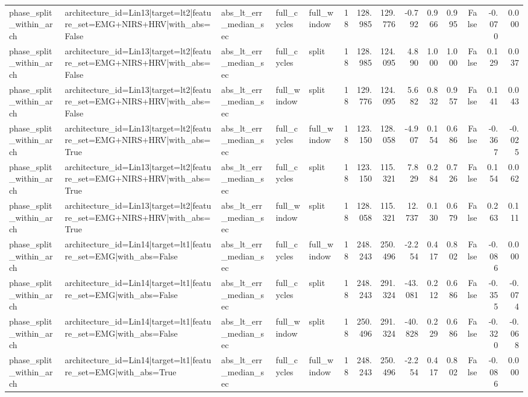 \begin{table}
\begin{tabular}{lllllrrrrrrrrr}
phase_split_within_arch & architecture_id=Lin13|target=lt2|feature_set=EMG+NIRS+HRV|with_abs=False & abs_lt_err_median_sec & full_cycles & full_window & 18 & 128.985 & 129.776 & -0.792 & 0.966 & 0.995 & False & -0.070 & 0.000 \\
phase_split_within_arch & architecture_id=Lin13|target=lt2|feature_set=EMG+NIRS+HRV|with_abs=False & abs_lt_err_median_sec & full_cycles & split & 18 & 128.985 & 124.095 & 4.890 & 1.000 & 1.000 & False & 0.129 & 0.037 \\
phase_split_within_arch & architecture_id=Lin13|target=lt2|feature_set=EMG+NIRS+HRV|with_abs=False & abs_lt_err_median_sec & full_window & split & 18 & 129.776 & 124.095 & 5.682 & 0.832 & 0.957 & False & 0.141 & 0.043 \\
phase_split_within_arch & architecture_id=Lin13|target=lt2|feature_set=EMG+NIRS+HRV|with_abs=True & abs_lt_err_median_sec & full_cycles & full_window & 18 & 123.150 & 128.058 & -4.907 & 0.154 & 0.686 & False & -0.367 & -0.025 \\
phase_split_within_arch & architecture_id=Lin13|target=lt2|feature_set=EMG+NIRS+HRV|with_abs=True & abs_lt_err_median_sec & full_cycles & split & 18 & 123.150 & 115.321 & 7.829 & 0.284 & 0.726 & False & 0.154 & 0.062 \\
phase_split_within_arch & architecture_id=Lin13|target=lt2|feature_set=EMG+NIRS+HRV|with_abs=True & abs_lt_err_median_sec & full_window & split & 18 & 128.058 & 115.321 & 12.737 & 0.130 & 0.679 & False & 0.263 & 0.111 \\
phase_split_within_arch & architecture_id=Lin14|target=lt1|feature_set=EMG|with_abs=False & abs_lt_err_median_sec & full_cycles & full_window & 18 & 248.243 & 250.496 & -2.254 & 0.417 & 0.802 & False & -0.086 & 0.000 \\
phase_split_within_arch & architecture_id=Lin14|target=lt1|feature_set=EMG|with_abs=False & abs_lt_err_median_sec & full_cycles & split & 18 & 248.243 & 291.324 & -43.081 & 0.212 & 0.686 & False & -0.355 & -0.074 \\
phase_split_within_arch & architecture_id=Lin14|target=lt1|feature_set=EMG|with_abs=False & abs_lt_err_median_sec & full_window & split & 18 & 250.496 & 291.324 & -40.828 & 0.229 & 0.686 & False & -0.320 & -0.068 \\
phase_split_within_arch & architecture_id=Lin14|target=lt1|feature_set=EMG|with_abs=True & abs_lt_err_median_sec & full_cycles & full_window & 18 & 248.243 & 250.496 & -2.254 & 0.417 & 0.802 & False & -0.086 & 0.000 \\

\end{tabular}
\end{table}
